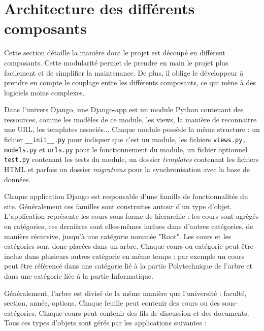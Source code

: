\documentclass[a4paper,12pt]{article}
\begin{document}
\section{Architecture des différents composants}

Cette section détaille la manière dont le projet est découpé en différent
composants. Cette modularité permet de prendre en main le projet plus facilement
et de simplifier la maintenance. De plus, il oblige le développeur à
prendre en compte le couplage entre les différents composants, ce qui mène
à des logiciels moins complexes.

Dans l'univers Django, une Django-app est un module Python contenant des
ressources, comme les modèles de ce module, les views, la manière de reconnaitre
une URL, les templates associés... Chaque module possède la même structure : un fichier
\texttt{\_\_init\_\_.py} pour indiquer que c'est un module, les fichiers
\texttt{views.py, models.py} et \texttt{urls.py} pour le fonctionnement du module,
un fichier optionnel \texttt{test.py} contenant les tests du module, un dossier
\textit{templates} contenant les fichiers HTML et parfois un dossier \textit{migrations}
pour la synchronisation avec la base de données.

Chaque application Django est responsable d'une famille de fonctionnalités du site.
Généralement ces familles sont construites autour d'un type d'objet. L'application
représente les cours sous forme de hierarchie : les cours sont agrégés en catégories,
ces dernières sont elles-mêmes inclues dans d'autres catégories, de manière récursive,
jusqu'à une catégorie nommée "Root". Les cours et les catégories sont donc
placées dans un arbre. Chaque cours ou catégorie peut être inclue dans plusieurs
autres catégorie en même temps : par exemple un cours peut être référencé dans
une catégorie lié à la partie Polytechnique de l'arbre et dans une catégorie liée à la
partie Informatique.

Généralement, l'arbre est divisé de la même manière que l'université : faculté,
section, année, options. Chaque feuille peut contenir des cours ou des sous-catégories.
Chaque cours peut contenir des fils de discussion et des documents. Tous ces
types d'objets sont gérés par les applications suivantes :
\end{document}
